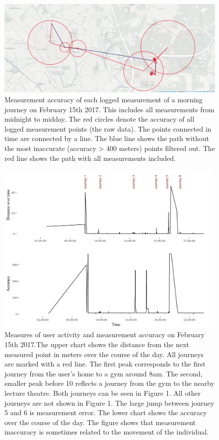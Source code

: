 \documentclass[english,man]{apa6}
\theoremstyle{definition}
\theoremstyle{definition}
\theoremstyle{definition}
\theoremstyle{remark}
\begin{document}
\begin{figure}
\includegraphics[width=1\linewidth]{img/journeyTillMiddayBoaz} \caption{Measurement accuracy of each logged measurement of a morning journey on February 15th 2017. This includes all measurements from midnight to midday. The red circles denote the accuracy of all logged measurement points (the raw data). The points connected in time are connected by a line. The blue line shows the path without the most inaccurate (accuracy > 400 meters) points filtered out. The red line shows the path with all measurements included. }\label{fig:accuracyPlot}
\end{figure}

\begin{figure}
\includegraphics[width=1\linewidth]{img/accuracyLocShift} \caption{Measures of user activity and measurement accuracy on February 15th 2017.The upper chart shows the distance from the next measured point in meters over the course of the day. All journeys are marked with a red line. The first peak corresponds to the first journey from the user's home to a gym around 8am. The second, smaller peak before 10 reflects a journey from the gym to the nearby lecture theatre. Both journeys can be seen in Figure 1. All other journeys are not shown in Figure 1. The large jump between journey 5 and 6 is measurement error. The lower chart shows the accuracy over the course of the day. The figure shows that measurement inaccuracy is sometimes related to the movement of the individual.}\label{fig:accuracyPlot2}
\end{figure}
\end{document}
